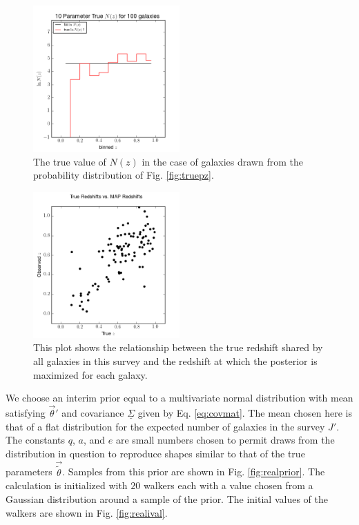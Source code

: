 \documentclass[preprint]{aastex}
\newcommand{\textul}{\underline}
\begin{document}
\begin{figure}
\includegraphics[width=0.5\textwidth]{real/trueNz.png}
\caption{The true value of $N(z)$ in the case of galaxies drawn from the probability distribution of Fig. \ref{fig:truepz}.}
\label{fig:realtrueNz}
\end{figure}

\begin{figure}
\includegraphics[width=0.5\textwidth]{real/truevmap.png}
\caption{This plot shows the relationship between the true redshift shared by all galaxies in this survey and the redshift at which the posterior is maximized for each galaxy.}
\label{fig:realcat}
\end{figure}

We choose an interim prior equal to a multivariate normal distribution with mean satisfying $\vec{\theta}'$ and covariance $\textul{\Sigma}$ given by Eq. \ref{eq:covmat}.  The mean chosen here is that of a flat distribution for the expected number of galaxies in the survey $J'$.  The constants $q$, $a$, and $e$ are small numbers chosen to permit draws from the distribution in question to reproduce shapes similar to that of the true parameters $\vec{\tilde{\theta}}$.  Samples from this prior are shown in Fig. \ref{fig:realprior}.  The calculation is initialized with $20$ walkers each with a value chosen from a Gaussian distribution around a sample of the prior.  The initial values of the walkers are shown in Fig. \ref{fig:realival}.
\end{document}

